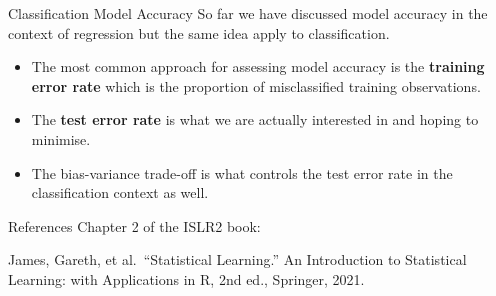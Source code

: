 \documentclass[
  ignorenonframetext,
  aspectratio=169,
]{beamer}
\providecommand{\tightlist}{%
  \setlength{\itemsep}{0pt}\setlength{\parskip}{0pt}}\usepackage{longtable,booktabs,array}
\begin{document}
\begin{frame}{Classification Model Accuracy}
\protect\hypertarget{classification-model-accuracy}{}
So far we have discussed model accuracy in the context of regression but
the same idea apply to classification.

\begin{itemize}
\tightlist
\item
  The most common approach for assessing model accuracy is the
  \textbf{training error rate} which is the
  \alert{proportion of misclassified training observations}.
\item
  The \textbf{test error rate} is what we are actually interested in and
  hoping to minimise.
\item
  The bias-variance trade-off is what controls the test error rate in
  the classification context as well.
\end{itemize}
\end{frame}

\begin{frame}{References}
\protect\hypertarget{references}{}
Chapter 2 of the ISLR2 book:

James, Gareth, et al.~``Statistical Learning.'' An Introduction to
Statistical Learning: with Applications in R, 2nd ed., Springer, 2021.
\end{frame}
\end{document}
